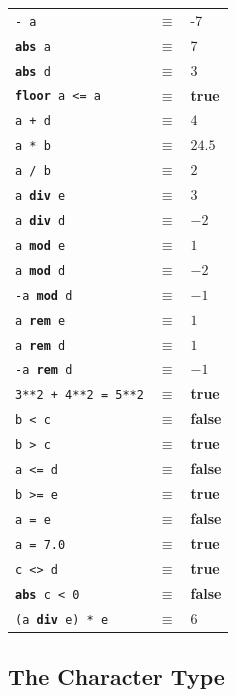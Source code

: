 \documentclass{overturerepchap}
\newcommand{\keyw}[1]{{\bf\ttfamily #1}}
\begin{document}
\begin{description}
  \begin{longtable}{lcl}
    {\tt - a}&$\equiv$& -7                     \\
    {\tt \keyw{abs} a}&$\equiv$& 7                    \\
    {\tt \keyw{abs} d}&$\equiv$& 3                    \\
    {\tt \keyw{floor} a <= a}&$\equiv$& \keyw{true}   \\
    {\tt a + d}&$\equiv$& $4$                  \\
    {\tt a * b}&$\equiv$& $24.5$               \\
    {\tt a / b}&$\equiv$& $2$                \\
    {\tt a \keyw{div} e}&$\equiv$& $3$                \\
    {\tt a \keyw{div} d}&$\equiv$& $-2$               \\
    {\tt a \keyw{mod} e}&$\equiv$& $1$                \\
    {\tt a \keyw{mod} d}&$\equiv$& $-2$               \\
    {\tt -a \keyw{mod} d}&$\equiv$& $-1$               \\
    {\tt a \keyw{rem} e}&$\equiv$& $1$                \\
    {\tt a \keyw{rem} d}&$\equiv$& $1$                \\
    {\tt -a \keyw{rem} d}&$\equiv$& $-1$              \\
    {\tt 3**2 + 4**2 = 5**2} &$\equiv$ &\keyw{true}   \\
    {\tt b < c}&$\equiv$& \keyw{false}                \\
    {\tt b > c}&$\equiv$& \keyw{true}                 \\
    {\tt a <= d}&$\equiv$& \keyw{false}               \\
    {\tt b >= e}&$\equiv$& \keyw{true}                \\
    {\tt a = e}&$\equiv$& \keyw{false}                \\
    {\tt a = 7.0}&$\equiv$& \keyw{true}               \\
    {\tt c <> d}&$\equiv$& \keyw{true}                \\
    {\tt \keyw{abs} c < 0} & $\equiv$ & \keyw{false}  \\
    {\tt (a \keyw{div} e) * e} & $\equiv$ & 6       
  \end{longtable}
\end{description}

\subsection{The Character Type}
\end{document}
